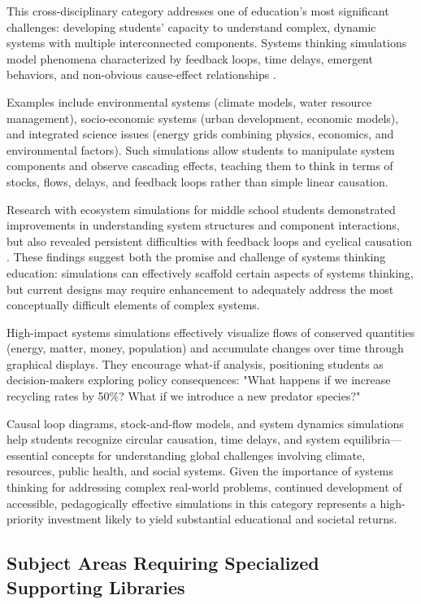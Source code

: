 This cross-disciplinary category addresses one of education's most significant challenges: developing students' capacity to understand complex, dynamic systems with multiple interconnected components. Systems thinking simulations model phenomena characterized by feedback loops, time delays, emergent behaviors, and non-obvious cause-effect relationships \cite{eric2009}.

Examples include environmental systems (climate models, water resource management), socio-economic systems (urban development, economic models), and integrated science issues (energy grids combining physics, economics, and environmental factors). Such simulations allow students to manipulate system components and observe cascading effects, teaching them to think in terms of stocks, flows, delays, and feedback loops rather than simple linear causation.

Research with ecosystem simulations for middle school students demonstrated improvements in understanding system structures and component interactions, but also revealed persistent difficulties with feedback loops and cyclical causation \cite{eric2009}. These findings suggest both the promise and challenge of systems thinking education: simulations can effectively scaffold certain aspects of systems thinking, but current designs may require enhancement to adequately address the most conceptually difficult elements of complex systems.

High-impact systems simulations effectively visualize flows of conserved quantities (energy, matter, money, population) and accumulate changes over time through graphical displays. They encourage what-if analysis, positioning students as decision-makers exploring policy consequences: "What happens if we increase recycling rates by 50\%? What if we introduce a new predator species?"

Causal loop diagrams, stock-and-flow models, and system dynamics simulations help students recognize circular causation, time delays, and system equilibria---essential concepts for understanding global challenges involving climate, resources, public health, and social systems. Given the importance of systems thinking for addressing complex real-world problems, continued development of accessible, pedagogically effective simulations in this category represents a high-priority investment likely to yield substantial educational and societal returns.

\subsection{Subject Areas Requiring Specialized Supporting Libraries}

